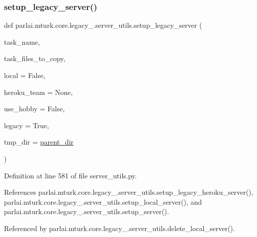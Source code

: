 \subsubsection{\texorpdfstring{setup\+\_\+legacy\+\_\+server()}{setup\_legacy\_server()}}
{\footnotesize\ttfamily def parlai.\+mturk.\+core.\+legacy\+\_.\+server\+\_\+utils.\+setup\+\_\+legacy\+\_\+server (\begin{DoxyParamCaption}\item[{}]{task\+\_\+name,  }\item[{}]{task\+\_\+files\+\_\+to\+\_\+copy,  }\item[{}]{local = {\ttfamily False},  }\item[{}]{heroku\+\_\+team = {\ttfamily None},  }\item[{}]{use\+\_\+hobby = {\ttfamily False},  }\item[{}]{legacy = {\ttfamily True},  }\item[{}]{tmp\+\_\+dir = {\ttfamily \hyperlink{namespaceparlai_1_1mturk_1_1core_1_1legacy__2018_1_1server__utils_a6a871d2f8e5c0768a82ab8fa2e7fadae}{parent\+\_\+dir}} }\end{DoxyParamCaption})}



Definition at line 581 of file server\+\_\+utils.\+py.



References parlai.\+mturk.\+core.\+legacy\+\_.\+server\+\_\+utils.\+setup\+\_\+legacy\+\_\+heroku\+\_\+server(), parlai.\+mturk.\+core.\+legacy\+\_.\+server\+\_\+utils.\+setup\+\_\+local\+\_\+server(), and parlai.\+mturk.\+core.\+legacy\+\_.\+server\+\_\+utils.\+setup\+\_\+server().



Referenced by parlai.\+mturk.\+core.\+legacy\+\_.\+server\+\_\+utils.\+delete\+\_\+local\+\_\+server().

